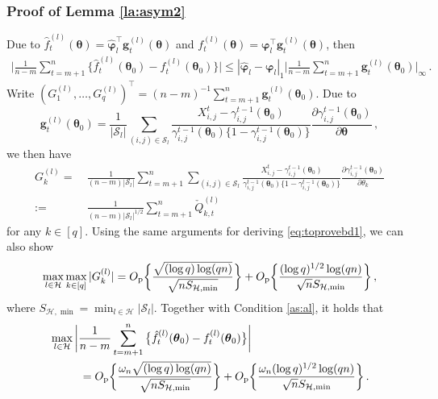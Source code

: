 \documentclass[12pt]{article}
\newcommand{\btheta}{\boldsymbol \theta}
\newcommand{\bvarphi}{\boldsymbol \varphi}
\def\T{{\scriptscriptstyle \top} }
\newcommand{\bg}{{\mathbf g}}
\newcommand{\0}{{\bf 0}}
\begin{document}
\subsubsection{Proof of Lemma \ref{la:asym2}}\label{pf:laasymp2}

Due to $\hat{f}_t^{(l)}(\btheta)=\hat{\bvarphi}_l^{\T}\bg_t^{(l)}(\btheta)$ and $f_t^{(l)}(\btheta)=\bvarphi_l^{\T}\bg_t^{(l)}(\btheta)$, then
\begin{align*}
\bigg|\frac{1}{n-m}\sum_{t=m+1}^n\big\{\hat{f}_t^{(l)}(\btheta_0)-f_t^{(l)}(\btheta_0)\big\}\bigg|\leq |\hat{\bvarphi}_l-\bvarphi_l|_1\bigg|\frac{1}{n-m}\sum_{t=m+1}^n\bg_t^{(l)}(\btheta_0)\bigg|_\infty\,.
\end{align*}
Write $(G_1^{(l)},\ldots,G_q^{(l)})^{\T}=(n-m)^{-1}\sum_{t=m+1}^n\bg_t^{(l)}(\btheta_0)$. Due to 
\[
\bg_t^{(l)}(\btheta_0)=\frac{1}{|\mathcal{S}_l|}\sum_{(i,j)\in\mathcal{S}_l}\frac{X_{i,j}^t-\gamma_{i,j}^{t-1}(\btheta_0)}{\gamma_{i,j}^{t-1}(\btheta_0)\{1-\gamma_{i,j}^{t-1}(\btheta_0)\}}\frac{\partial\gamma_{i,j}^{t-1}(\btheta_0)}{\partial\btheta}\,,
\]
we then have
\begin{align*}
G_k^{(l)}=&~\frac{1}{(n-m)|\mathcal{S}_l|}\sum_{t=m+1}^n\sum_{(i,j)\in\mathcal{S}_l}\frac{X_{i,j}^t-\gamma_{i,j}^{t-1}(\btheta_0)}{\gamma_{i,j}^{t-1}(\btheta_0)\{1-\gamma_{i,j}^{t-1}(\btheta_0)\}}\frac{\partial\gamma_{i,j}^{t-1}(\btheta_0)}{\partial\theta_k}\\
:=&~\frac{1}{(n-m)|\mathcal{S}_l|^{1/2}}\sum_{t=m+1}^n\check{Q}_{k,t}^{(l)}
\end{align*}
for any $k\in[q]$. Using the same arguments for deriving \eqref{eq:toprovebd1}, we can also show
\begin{align}\label{eq:asymbd3}
\max_{l\in\mathcal{H}}\max_{k\in[q]}|G_k^{(l)}|=O_{\rm p}\bigg\{\frac{\sqrt{(\log q)\log(qn)}}{\sqrt{nS_{\mathcal{H},\min}}}\bigg\}+O_{\rm p}\bigg\{\frac{(\log q)^{1/2}\log(qn)}{\sqrt{n}S_{\mathcal{H},\min}}\bigg\}\,,
\end{align}
where $S_{\mathcal{H},\min}=\min_{l\in\mathcal{H}}|\mathcal{S}_l|$. Together with Condition \ref{as:al}, it holds that
\begin{align}
&\max_{l\in\mathcal{H}}\bigg|\frac{1}{n-m}\sum_{t=m+1}^n\big\{\hat{f}_t^{(l)}(\btheta_0)-f_t^{(l)}(\btheta_0)\big\}\bigg|\notag\\
&~~~~~~~~=O_{\rm p}\bigg\{\frac{\omega_n\sqrt{(\log q)\log(qn)}}{\sqrt{nS_{\mathcal{H},\min}}}\bigg\}+O_{\rm p}\bigg\{\frac{\omega_n(\log q)^{1/2}\log(qn)}{\sqrt{n}S_{\mathcal{H},\min}}\bigg\}\,.\label{eq:asymbd4}
\end{align}
\end{document}
